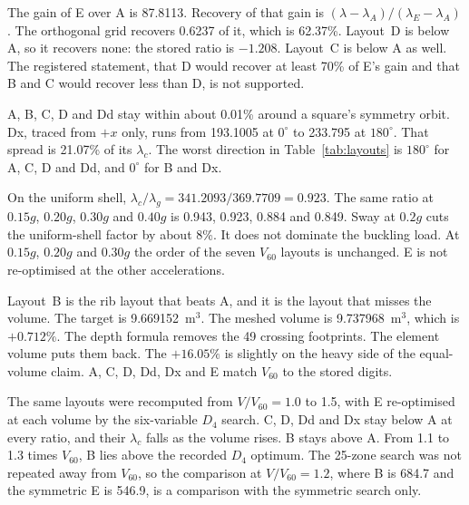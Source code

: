 \documentclass[11pt,a4paper]{article}
\begin{document}
The gain of E over A is 87.8113.
Recovery of that gain is \((\lambda-\lambda_A)/(\lambda_E-\lambda_A)\).
The orthogonal grid recovers 0.6237 of it, which is 62.37\%.
Layout~D is below A, so it recovers none: the stored ratio is \(-1.208\).
Layout~C is below A as well.
The registered statement, that D would recover at least 70\% of E's gain and that B and C would recover less than D, is not supported.

A, B, C, D and Dd stay within about 0.01\% around a square's symmetry orbit.
Dx, traced from \(+x\) only, runs from 193.1005 at \(0^{\circ}\) to 233.795 at \(180^{\circ}\).
That spread is 21.07\% of its \(\lambda_c\).
The worst direction in Table~\ref{tab:layouts} is \(180^{\circ}\) for A, C, D and Dd, and \(0^{\circ}\) for B and Dx.

On the uniform shell, \(\lambda_c/\lambda_g = 341.2093/369.7709 = 0.923\).
The same ratio at \(0.15g\), \(0.20g\), \(0.30g\) and \(0.40g\) is 0.943, 0.923, 0.884 and 0.849.
Sway at \(0.2g\) cuts the uniform-shell factor by about 8\%.
It does not dominate the buckling load.
At \(0.15g\), \(0.20g\) and \(0.30g\) the order of the seven \(V_{60}\) layouts is unchanged.
E is not re-optimised at the other accelerations.

Layout~B is the rib layout that beats A, and it is the layout that misses the volume.
The target is 9.669152~m\(^{3}\).
The meshed volume is 9.737968~m\(^{3}\), which is \(+0.712\%\).
The depth formula removes the 49 crossing footprints.
The element volume puts them back.
The \(+16.05\%\) is slightly on the heavy side of the equal-volume claim.
A, C, D, Dd, Dx and E match \(V_{60}\) to the stored digits.

The same layouts were recomputed from \(V/V_{60} = 1.0\) to 1.5, with E re-optimised at each volume by the six-variable \(D_4\) search.
C, D, Dd and Dx stay below A at every ratio, and their \(\lambda_c\) falls as the volume rises.
B stays above A.
From 1.1 to 1.3 times \(V_{60}\), B lies above the recorded \(D_4\) optimum.
The 25-zone search was not repeated away from \(V_{60}\), so the comparison at \(V/V_{60} = 1.2\), where B is 684.7 and the symmetric E is 546.9, is a comparison with the symmetric search only.

\begin{table}[t]
\centering
\caption{Equal-volume layouts at \(V_{60}\).
\(\lambda_c\) is the eight-direction minimum, except for E, where it is the minimum of \(0^{\circ}\) and \(45^{\circ}\).
\(\lambda_{\mathrm{GNIA}}\) is the minimum over \(L/300\), \(L/500\) and \(L/1000\) of the weaker sign, which is peak-down on every governing row.
For A, C and E that minimum is at \(L/500\).
For D it is at \(L/300\), so the \(-24.05\%\) is not a same-amplitude comparison.
The \(+15.02\%\) on E rounds the unrounded ratio \(+15.021\%\).
The ratio of the two-decimal factors, \((135.96-118.20)/118.20\), is \(+15.025\%\), which rounds to \(+15.03\%\).
B, Dd and Dx were not run on the imperfect path.
B is 0.712\% above \(V_{60}\) in the mesh.}
\label{tab:layouts}
\small

\end{table}
\end{document}
